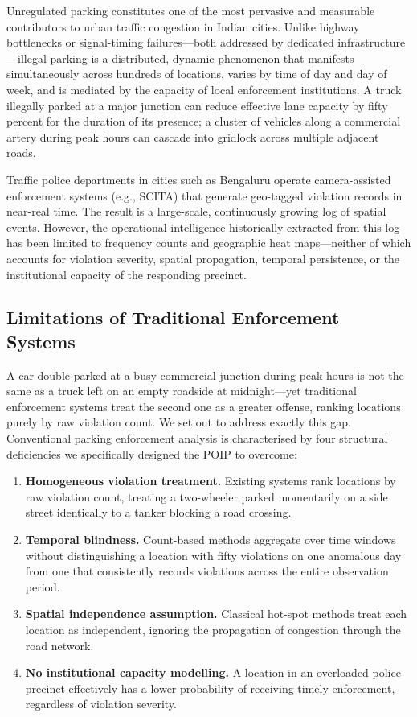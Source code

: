 \documentclass[12pt,a4paper]{article}
\begin{document}
Unregulated parking constitutes one of the most pervasive and measurable contributors to
urban traffic congestion in Indian cities. Unlike highway bottlenecks or signal-timing
failures—both addressed by dedicated infrastructure—illegal parking is a distributed,
dynamic phenomenon that manifests simultaneously across hundreds of locations, varies by
time of day and day of week, and is mediated by the capacity of local enforcement
institutions. A truck illegally parked at a major junction can reduce effective lane
capacity by fifty percent for the duration of its presence; a cluster of vehicles along a
commercial artery during peak hours can cascade into gridlock across multiple adjacent roads.

Traffic police departments in cities such as Bengaluru operate camera-assisted enforcement
systems (e.g., SCITA) that generate geo-tagged violation records in near-real time. The
result is a large-scale, continuously growing log of spatial events. However, the operational
intelligence historically extracted from this log has been limited to frequency counts and
geographic heat maps—neither of which accounts for violation severity, spatial propagation,
temporal persistence, or the institutional capacity of the responding precinct.

\subsection{Limitations of Traditional Enforcement Systems}

A car double-parked at a busy commercial junction during peak hours is not the same as a
truck left on an empty roadside at midnight---yet traditional enforcement systems treat
the second one as a greater offense, ranking locations purely by raw violation count. We set out to address
exactly this gap. Conventional parking enforcement analysis is characterised by four
structural deficiencies we specifically designed the POIP to overcome:

\begin{enumerate}[leftmargin=1.5em]
  \item \textbf{Homogeneous violation treatment.} Existing systems rank locations by raw
  violation count, treating a two-wheeler parked momentarily on a side street identically
  to a tanker blocking a road crossing.

  \item \textbf{Temporal blindness.} Count-based methods aggregate over time windows without
  distinguishing a location with fifty violations on one anomalous day from one that
  consistently records violations across the entire observation period.

  \item \textbf{Spatial independence assumption.} Classical hot-spot methods treat each
  location as independent, ignoring the propagation of congestion through the road network.

  \item \textbf{No institutional capacity modelling.} A location in an overloaded police
  precinct effectively has a lower probability of receiving timely enforcement, regardless
  of violation severity.
\end{enumerate}
\end{document}

